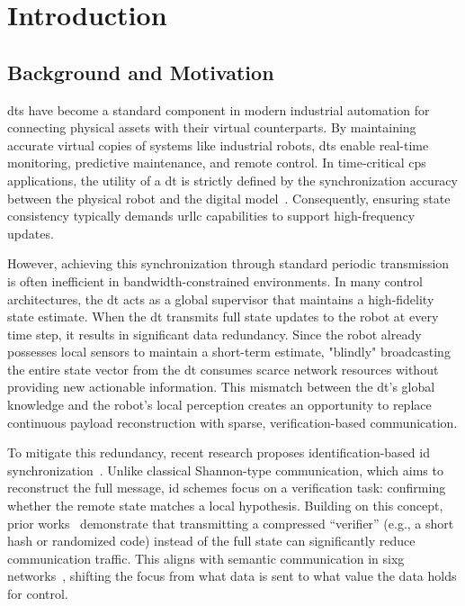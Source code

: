 \chapter{Introduction}
\label{ch:introduction}

\section{Background and Motivation}
\label{sec:background_motivation}

\glspl{dt} have become a standard component in modern industrial automation for connecting physical assets with their virtual counterparts. By maintaining accurate virtual copies of systems like industrial robots, \glspl{dt} enable real-time monitoring, predictive maintenance, and remote control. In time-critical \gls{cps} applications, the utility of a \gls{dt} is strictly defined by the synchronization accuracy between the physical robot and the digital model~\cite{9013428}. Consequently, ensuring state consistency typically demands \gls{urllc} capabilities to support high-frequency updates.

However, achieving this synchronization through standard periodic transmission is often inefficient in bandwidth-constrained environments. In many control architectures, the \gls{dt} acts as a global supervisor that maintains a high-fidelity state estimate. When the \gls{dt} transmits full state updates to the robot at every time step, it results in significant data redundancy. Since the robot already possesses local sensors to maintain a short-term estimate, "blindly" broadcasting the entire state vector from the \gls{dt} consumes scarce network resources without providing new actionable information. This mismatch between the \gls{dt}'s global knowledge and the robot's local perception creates an opportunity to replace continuous payload reconstruction with sparse, verification-based communication.

To mitigate this redundancy, recent research proposes identification-based \gls{id} synchronization~\cite{9789759}. Unlike classical Shannon-type communication, which aims to reconstruct the full message, \gls{id} schemes focus on a verification task: confirming whether the remote state matches a local hypothesis. Building on this concept, prior works~\cite{fi16030078} demonstrate that transmitting a compressed ``verifier'' (e.g., a short hash or randomized code) instead of the full state can significantly reduce communication traffic. This aligns with semantic communication in \gls{sixg} networks~\cite{doi:https://doi.org/10.1002/9781119765554.ch16}, shifting the focus from what data is sent to what value the data holds for control.

